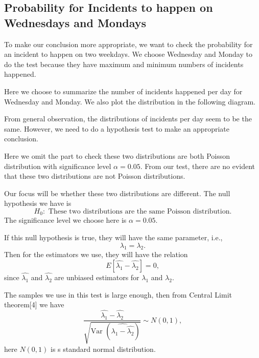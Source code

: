 \documentclass[11pt,a4paper,english]{article}
\begin{document}
\subsection{Probability for Incidents to happen on Wednesdays and Mondays}
To make our conclusion more appropriate, we want to check the probability for an incident to happen on two weekdays. 
We choose Wednesday and Monday to do the test because they have maximum and minimum numbers of incidents happened.

Here we choose to summarize the number of incidents happened per day for Wednesday and Monday. We also plot the distribution in the following diagram.

From general observation, the distributions of incidents per day seem to be the same. However, we need to do a hypothesis test to make an appropriate conclusion.

Here we omit the part to check these two distributions are both Poisson distribution with significance level $\alpha = 0.05$. From our test, there are no evident that these two distributions are not Poisson distributions.

Our focus will be whether these two distributions are different. The null hypothesis we have is 
\[H_{0}:\text{ These two distributions are the same Poisson distribution.}\]
The significance level we choose here is $\alpha = 0.05$.

If this null hypothesis is true, they will have the same parameter, i.e.,
\[\lambda_{1} = \lambda_{2}.\]
Then for the estimators we use, they will have the relation 
\[E[\hat{\lambda_{1}}-\hat{\lambda_{2}}] = 0,\]
since $\hat{\lambda_{1}}$ and $\hat{\lambda_{2}}$ are unbiased estimators for $\lambda_{1}$ and $\lambda_{2}$.

The samples we use in this test is large enough, then from Central Limit theorem[4] we have 
\[\frac{\hat{\lambda_{1}}-\hat{\lambda_{2}}}{\sqrt{\text{Var }(\hat{\lambda_{1}-\hat{\lambda_{2}}})}}\sim N(0,1),\]
here $N(0,1)$ is s standard normal distribution.
\end{document}

